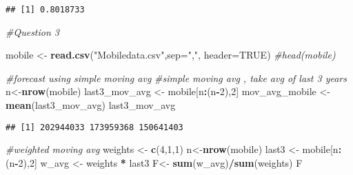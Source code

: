 \documentclass[]{article}
\newenvironment{Shaded}{\begin{snugshade}}{\end{snugshade}}
\newcommand{\KeywordTok}[1]{\textcolor[rgb]{0.13,0.29,0.53}{\textbf{#1}}}
\newcommand{\DataTypeTok}[1]{\textcolor[rgb]{0.13,0.29,0.53}{#1}}
\newcommand{\DecValTok}[1]{\textcolor[rgb]{0.00,0.00,0.81}{#1}}
\newcommand{\StringTok}[1]{\textcolor[rgb]{0.31,0.60,0.02}{#1}}
\newcommand{\CommentTok}[1]{\textcolor[rgb]{0.56,0.35,0.01}{\textit{#1}}}
\newcommand{\OtherTok}[1]{\textcolor[rgb]{0.56,0.35,0.01}{#1}}
\newcommand{\OperatorTok}[1]{\textcolor[rgb]{0.81,0.36,0.00}{\textbf{#1}}}
\newcommand{\NormalTok}[1]{#1}
\begin{document}
\begin{Shaded}
\end{Shaded}

\begin{verbatim}
## [1] 0.8018733
\end{verbatim}

\begin{Shaded}
\begin{Highlighting}[]
\CommentTok{#Question 3}

\NormalTok{mobile <-}\StringTok{ }\KeywordTok{read.csv}\NormalTok{(}\StringTok{"Mobiledata.csv"}\NormalTok{,}\DataTypeTok{sep=}\StringTok{","}\NormalTok{, }\DataTypeTok{header=}\OtherTok{TRUE}\NormalTok{)}
\CommentTok{#head(mobile)}

\CommentTok{#forecast using simple moving avg}
\CommentTok{#simple moving avg , take avg of last 3 years}
\NormalTok{n<-}\KeywordTok{nrow}\NormalTok{(mobile)}
\NormalTok{last3_mov_avg <-}\StringTok{ }\NormalTok{mobile[n}\OperatorTok{:}\NormalTok{(n}\OperatorTok{-}\DecValTok{2}\NormalTok{),}\DecValTok{2}\NormalTok{]}
\NormalTok{mov_avg_mobile <-}\StringTok{ }\KeywordTok{mean}\NormalTok{(last3_mov_avg)}
\NormalTok{last3_mov_avg}
\end{Highlighting}
\end{Shaded}

\begin{verbatim}
## [1] 202944033 173959368 150641403
\end{verbatim}

\begin{Shaded}
\begin{Highlighting}[]
\CommentTok{#weighted moving avg}
\NormalTok{weights <-}\StringTok{ }\KeywordTok{c}\NormalTok{(}\DecValTok{4}\NormalTok{,}\DecValTok{1}\NormalTok{,}\DecValTok{1}\NormalTok{)}
\NormalTok{n<-}\KeywordTok{nrow}\NormalTok{(mobile)}
\NormalTok{last3 <-}\StringTok{ }\NormalTok{mobile[n}\OperatorTok{:}\NormalTok{(n}\OperatorTok{-}\DecValTok{2}\NormalTok{),}\DecValTok{2}\NormalTok{] }
\NormalTok{w_avg <-}\StringTok{ }\NormalTok{weights }\OperatorTok{*}\StringTok{ }\NormalTok{last3}
\NormalTok{F<-}\StringTok{ }\KeywordTok{sum}\NormalTok{(w_avg)}\OperatorTok{/}\KeywordTok{sum}\NormalTok{(weights)}
\NormalTok{F}
\end{Highlighting}
\end{Shaded}
\end{document}
